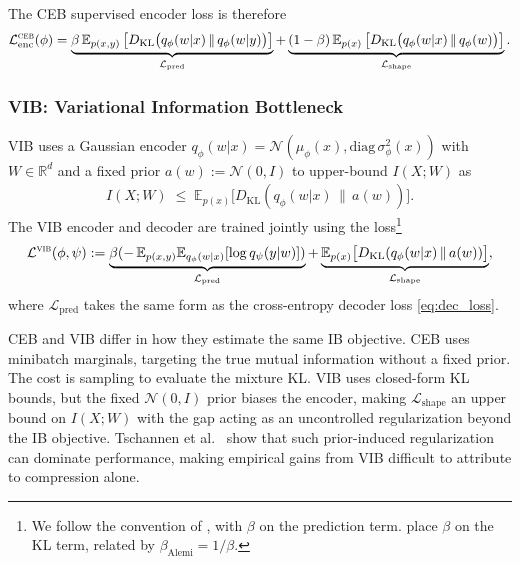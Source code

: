 \documentclass[11pt]{article}
\begin{document}
The CEB supervised encoder loss is therefore
\begin{align}
    \mathcal{L}_{\mathrm{enc}}^{\text{\textsc{ceb}}}(\phi)
    = \underbrace{\beta\,\mathbb{E}_{p(x,y)}\left[D_{\mathrm{KL}}
    \bigl(q_\phi(w|x)\,\|\,q_\phi(w|y)\bigr)\right]}_{\mathcal{L}_{\mathrm{pred}}}
    + \underbrace{(1-\beta)\,\mathbb{E}_{p(x)}\left[D_{\mathrm{KL}}
    \bigl(q_\phi(w|x)\,\|\,q_\phi(w)\bigr)\right]}_{\mathcal{L}_{\mathrm{shape}}}.
    \label{eq:sup_loss}
\end{align}

\subsubsection{VIB: Variational Information Bottleneck}
\label{sec:vib}

VIB \cite{alemi2017deep} uses a Gaussian encoder
$q_\phi(w|x)=\mathcal{N}(\mu_\phi(x),\mathrm{diag}\,\sigma^2_\phi(x))$
with $W\in\mathbb{R}^d$ and a fixed prior $a(w):=\mathcal{N}(0,I)$ to upper-bound $I(X;W)$ as
\begin{align}
    I(X;W) \;\leq\;
    \mathbb{E}_{p(x)}\bigl[D_{\mathrm{KL}}(q_\phi(w|x)\,\|\,a(w))\bigr].
    \label{eq:vib_kl}
\end{align}
The VIB encoder and decoder are trained jointly using the
loss\footnote{We follow the convention of
\cite{tishby1999information}, with $\beta$ on the prediction term.
\cite{alemi2017deep} place $\beta$ on the KL term, related by
$\beta_{\text{Alemi}}=1/\beta$.}
\begin{align}
    \mathcal{L}^{\text{\textsc{vib}}}(\phi,\psi)
    := \underbrace{\beta(-\,\mathbb{E}_{p(x,y)}\mathbb{E}_{q_\phi(w|x)}
    [\log q_\psi(y|w)])}_{\mathcal{L}_{\mathrm{pred}}} 
    + \underbrace{\mathbb{E}_{p(x)}\bigl[D_{\mathrm{KL}}
    (q_\phi(w|x)\,\|\,a(w))\bigr]}_{\mathcal{L}_{\mathrm{shape}}},
    \label{eq:vib_loss}
\end{align}
where $\mathcal{L}_{\mathrm{pred}}$ takes the same form as the cross-entropy decoder
loss \eqref{eq:dec_loss}.

CEB and VIB differ in how they estimate the same IB objective.
CEB uses minibatch marginals, targeting the true mutual information
without a fixed prior. The cost is sampling to evaluate the mixture
KL.
VIB uses closed-form KL bounds, but the
fixed $\mathcal{N}(0,I)$ prior biases the encoder, making
$\mathcal{L}_{\mathrm{shape}}$ an upper bound on $I(X;W)$ with the gap
acting as an uncontrolled regularization beyond the IB objective.
Tschannen et al.\ \cite{tschannen2020mutual} show that such
prior-induced regularization can dominate performance, making empirical
gains from VIB difficult to attribute to compression alone.
\end{document}
